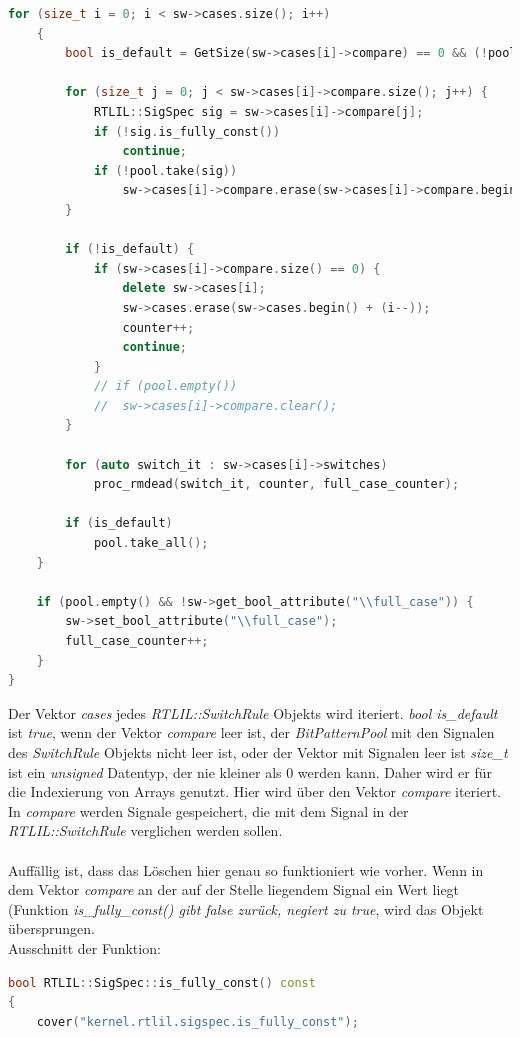 \documentclass[11pt]{report}
\begin{document}
\begin{enumerate}
\begin{lstlisting}[language=C++]
	for (size_t i = 0; i < sw->cases.size(); i++)
	{
		bool is_default = GetSize(sw->cases[i]->compare) == 0 && (!pool.empty() || GetSize(sw->signal) == 0);

		for (size_t j = 0; j < sw->cases[i]->compare.size(); j++) {
			RTLIL::SigSpec sig = sw->cases[i]->compare[j];
			if (!sig.is_fully_const())
				continue;
			if (!pool.take(sig))
				sw->cases[i]->compare.erase(sw->cases[i]->compare.begin() + (j--));
		}

		if (!is_default) {
			if (sw->cases[i]->compare.size() == 0) {
				delete sw->cases[i];
				sw->cases.erase(sw->cases.begin() + (i--));
				counter++;
				continue;
			}
			// if (pool.empty())
			// 	sw->cases[i]->compare.clear();
		}

		for (auto switch_it : sw->cases[i]->switches)
			proc_rmdead(switch_it, counter, full_case_counter);

		if (is_default)
			pool.take_all();
	}

	if (pool.empty() && !sw->get_bool_attribute("\\full_case")) {
		sw->set_bool_attribute("\\full_case");
		full_case_counter++;
	}
}
\end{lstlisting}
Der Vektor \textit{cases} jedes \textit{RTLIL::SwitchRule} Objekts wird iteriert.
\textit{bool is\_default} ist \textit{true}, wenn der Vektor \textit{compare} leer ist, der \textit{BitPatternPool} mit den Signalen des \textit{SwitchRule} Objekts nicht leer ist, oder der Vektor mit Signalen leer ist
\textit{size\_t} ist ein \textit{unsigned} Datentyp, der nie kleiner als 0 werden kann. Daher wird er für die Indexierung von Arrays genutzt. Hier wird über den Vektor \textit{compare} iteriert.\\
In \textit{compare} werden Signale gespeichert, die mit dem Signal in der \textit{RTLIL::SwitchRule} verglichen werden sollen.
\\
\\
Auffällig ist, dass das Löschen hier genau so funktioniert wie vorher. 
Wenn in dem Vektor \textit{compare} an der auf der Stelle liegendem Signal ein Wert liegt (Funktion \textit{is\_fully\_const() gibt \textit{false} zurück, negiert zu \textit{true}}, wird das Objekt übersprungen.\\
Ausschnitt der Funktion:
\begin{lstlisting}[language=C++]
bool RTLIL::SigSpec::is_fully_const() const
{
	cover("kernel.rtlil.sigspec.is_fully_const");


\end{lstlisting}
\end{enumerate}
\end{document}
